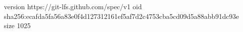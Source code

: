 version https://git-lfs.github.com/spec/v1
oid sha256:ecafda5fa56a83e0f4d127312161ef5af7d2c4753cba5cd09d5a88abb91dc93e
size 1025
